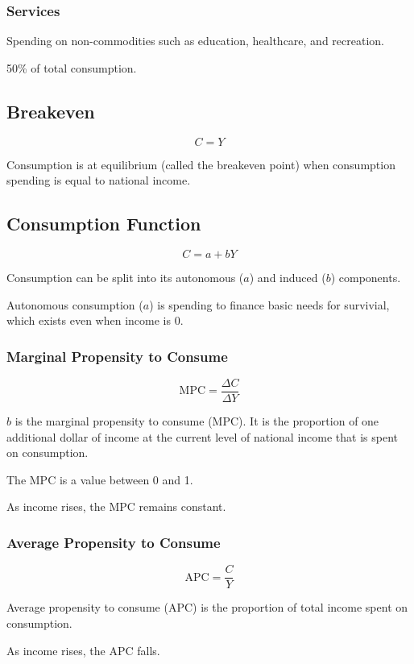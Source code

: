 \documentclass[a4paper,11pt]{article}
\begin{document}
\subsubsection{Services}

Spending on non-commodities such as education, healthcare, and recreation.

50\% of total consumption.


\subsection{Breakeven}

$$
C = Y
$$

Consumption is at equilibrium (called the breakeven point) when consumption
spending is equal to national income.


\subsection{Consumption Function}

$$
C = a + bY
$$

Consumption can be split into its autonomous ($a$) and induced ($b$) components.

Autonomous consumption ($a$) is spending to finance basic needs for survivial,
which exists even when income is 0.


\subsubsection{Marginal Propensity to Consume}

$$
\mbox{MPC} = \frac{\Delta C}{\Delta Y}
$$

$b$ is the marginal propensity to consume (MPC). It is the proportion of one
additional dollar of income at the current level of national income that is
spent on consumption.

The MPC is a value between 0 and 1.

As income rises, the MPC remains constant.


\subsubsection{Average Propensity to Consume}

$$
\mbox{APC} = \frac{C}{Y}
$$

Average propensity to consume (APC) is the proportion of total income spent on
consumption.

As income rises, the APC falls.
\end{document}
